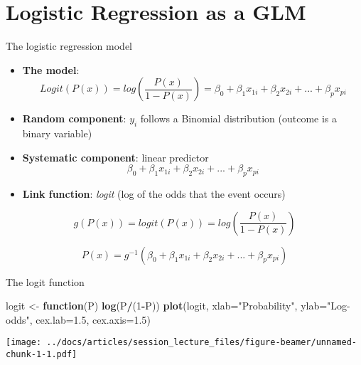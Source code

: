 \documentclass[
  ignorenonframetext,
]{beamer}
\newenvironment{Shaded}{\begin{snugshade}}{\end{snugshade}}
\newcommand{\ControlFlowTok}[1]{\textcolor[rgb]{0.13,0.29,0.53}{\textbf{#1}}}
\newcommand{\DataTypeTok}[1]{\textcolor[rgb]{0.13,0.29,0.53}{#1}}
\newcommand{\DecValTok}[1]{\textcolor[rgb]{0.00,0.00,0.81}{#1}}
\newcommand{\FloatTok}[1]{\textcolor[rgb]{0.00,0.00,0.81}{#1}}
\newcommand{\KeywordTok}[1]{\textcolor[rgb]{0.13,0.29,0.53}{\textbf{#1}}}
\newcommand{\NormalTok}[1]{#1}
\newcommand{\OperatorTok}[1]{\textcolor[rgb]{0.81,0.36,0.00}{\textbf{#1}}}
\newcommand{\StringTok}[1]{\textcolor[rgb]{0.31,0.60,0.02}{#1}}
\begin{document}
\hypertarget{logistic-regression-as-a-glm}{%
\section{Logistic Regression as a
GLM}\label{logistic-regression-as-a-glm}}

\begin{frame}{The logistic regression model}
\protect\hypertarget{the-logistic-regression-model}{}

\begin{itemize}
\item
  \textbf{The model}: \[
  Logit(P(x)) = log \left( \frac{P(x)}{1-P(x)} \right) = \beta_0 + \beta_1 x_{1i} + \beta_2 x_{2i} + ... + \beta_p x_{pi}
  \]
\item
  \textbf{Random component}: \(y_i\) follows a Binomial distribution
  (outcome is a binary variable)
\item
  \textbf{Systematic component}: linear predictor \[
  \beta_0 + \beta_1 x_{1i} + \beta_2 x_{2i} + ... + \beta_p x_{pi}
  \]
\item
  \textbf{Link function}: \emph{logit} (log of the odds that the event
  occurs)
\end{itemize}

\[
g(P(x)) = logit(P(x)) = log\left( \frac{P(x)}{1-P(x)} \right)
\]

\[
P(x) = g^{-1}\left( \beta_0 + \beta_1 x_{1i} + \beta_2 x_{2i} + ... + \beta_p x_{pi}
 \right)
\]

\end{frame}

\begin{frame}[fragile]{The logit function}
\protect\hypertarget{the-logit-function}{}

\small

\begin{Shaded}
\begin{Highlighting}[]
\NormalTok{logit <-}\StringTok{ }\ControlFlowTok{function}\NormalTok{(P) }\KeywordTok{log}\NormalTok{(P}\OperatorTok{/}\NormalTok{(}\DecValTok{1}\OperatorTok{-}\NormalTok{P))}
\KeywordTok{plot}\NormalTok{(logit, }\DataTypeTok{xlab=}\StringTok{"Probability"}\NormalTok{, }\DataTypeTok{ylab=}\StringTok{"Log-odds"}\NormalTok{,}
     \DataTypeTok{cex.lab=}\FloatTok{1.5}\NormalTok{, }\DataTypeTok{cex.axis=}\FloatTok{1.5}\NormalTok{)}
\end{Highlighting}
\end{Shaded}

\texttt{[image: ../docs/articles/session\_lecture\_files/figure-beamer/unnamed-chunk-1-1.pdf]}

\end{frame}
\end{document}
